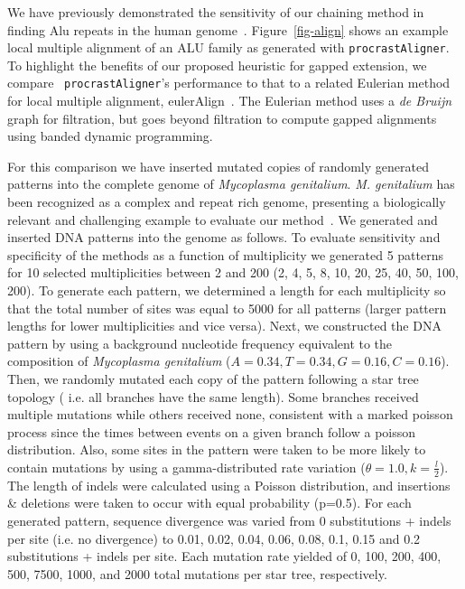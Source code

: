 \documentclass{ws-procs975x65}
\begin{document}
We have previously demonstrated the sensitivity of our chaining method in finding Alu repeats in
the human genome~\cite{ref-procrast}. Figure~\ref{fig-align} shows an example local multiple alignment of an ALU family as generated with \texttt{procrastAligner}. To highlight the benefits of our proposed heuristic for gapped extension, we compare ~\texttt{procrastAligner}'s performance to that to a related Eulerian method for local multiple alignment, eulerAlign~\cite{ref-related1}. The Eulerian method uses
a \textit{de Bruijn} graph for filtration, but goes beyond filtration to compute gapped alignments using banded dynamic
programming.

For this comparison we have inserted mutated copies of randomly generated patterns into the complete genome of \emph{Mycoplasma genitalium}. \emph{M. genitalium} has been recognized as a complex and repeat rich genome, presenting a biologically relevant and challenging example to evaluate our method~\cite{ref-mycoplasma}. We generated and inserted DNA patterns into the genome as follows. To evaluate sensitivity and specificity of the methods as a function of multiplicity we generated 5 patterns for 10 selected multiplicities between 2 and 200 (2, 4, 5, 8, 10, 20, 25, 40, 50, 100, 200). To generate each pattern, we determined a length for each multiplicity so that the total number of sites was equal to 5000 for all patterns (larger pattern lengths for lower multiplicities and vice versa). Next, we constructed the DNA pattern by using a background nucleotide frequency equivalent to the composition of \emph{Mycoplasma genitalium} ($A=0.34,T=0.34,G=0.16,C=0.16$). Then, we randomly mutated each copy of the pattern following a star tree topology ( i.e. all branches have the same length).  Some branches received multiple mutations while others received none, consistent with a marked poisson process since the times between events on a given branch follow a poisson distribution. Also, some sites in the pattern were taken to be more likely to contain mutations by using a gamma-distributed rate variation ($\theta = 1.0, k = \frac{l}{2}$). The length of indels were calculated using a Poisson distribution, and insertions \& deletions were taken to occur with equal probability (p=0.5). For each generated pattern, sequence divergence was varied from 0 substitutions + indels per site (i.e. no divergence) to 0.01, 0.02, 0.04, 0.06, 0.08, 0.1, 0.15 and 0.2 substitutions + indels per site. Each mutation rate yielded of 0, 100, 200, 400, 500, 7500, 1000, and 2000 total mutations per star tree, respectively.
\end{document}
